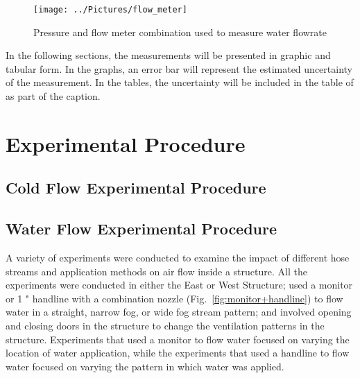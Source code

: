 \documentclass[12pt,oneside]{book}
\begin{document}
\begin{figure}[!ht]
\texttt{[image: ../Pictures/flow\_meter]}
\caption[Picture of Flowrate Meter]{Pressure and flow meter combination used to measure water flowrate}
\label{fig:flow_meter}
\end{figure}
\FloatBarrier

In the following sections, the measurements will be presented in graphic and tabular form. In the graphs, an error bar will represent the estimated uncertainty of the measurement. In the tables, the uncertainty will be included in the table of as part of the caption.

\section{Experimental Procedure}
\label{sec:Experimental_Procedure}

\subsection{Cold Flow Experimental Procedure}
\label{sec:Cold_Flow_Procedure}

\subsection{Water Flow Experimental Procedure}
\label{sec:Water_Flow_Procedure}
A variety of experiments were conducted to examine the impact of different hose streams and application methods on air flow inside a structure. All the experiments were conducted in either the East or West Structure; used a monitor %
or 1 " handline with a combination nozzle (Fig.~\ref{fig:monitor+handline}) to flow water in a straight, narrow fog, or wide fog stream pattern; and involved opening and closing doors in the structure to change the ventilation patterns in the structure. Experiments that used a monitor to flow water focused on varying the location of water application, while the experiments that used a handline to flow water focused on varying the pattern in which water was applied.
\end{document}
